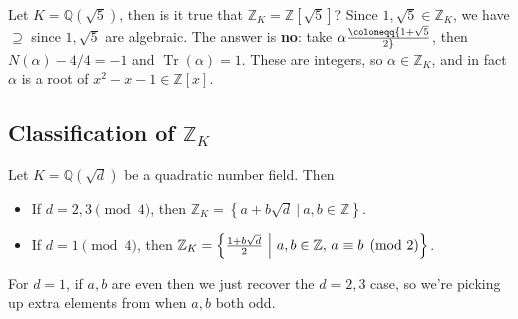 \begin{example}

Let \(K = {\mathbb{Q}}( \sqrt{5} )\), then is it true that
\({\mathbb{Z}}_K = {\mathbb{Z}}[\sqrt{5} ]\)? Since
\(1, \sqrt{5} \in {\mathbb{Z}}_K\), we have \(\supseteq\) since
\(1, \sqrt{5}\) are algebraic. The answer is \textbf{no}: take
\(\alpha\coloneqq{1 + \sqrt{5} \over 2}\), then \(N( \alpha) -4/4 = -1\)
and \(\operatorname{Tr}( \alpha) = 1\). These are integers, so
\(\alpha\in {\mathbb{Z}}_K\), and in fact \(\alpha\) is a root of
\(x^2 - x - 1 \in {\mathbb{Z}}[x]\).

\end{example}

\hypertarget{classification-of-mathbbz_k}{%
\subsection{\texorpdfstring{Classification of
\({\mathbb{Z}}_K\)}{Classification of \{\textbackslash mathbb\{Z\}\}\_K}}\label{classification-of-mathbbz_k}}

\begin{theorem}

Let \(K = {\mathbb{Q}}( \sqrt{d} )\) be a quadratic number field. Then

\begin{itemize}
\item
  If \(d = 2,3 \pmod 4\), then
  \({\mathbb{Z}}_K = \left\{{ a + b \sqrt{d} {~\mathrel{\Big|}~}a, b\in {\mathbb{Z}}}\right\}\).
\item
  If \(d=1 \pmod 4\), then
  \({\mathbb{Z}}_K = \left\{{ {1 + b \sqrt{d} \over 2} {~\mathrel{\Big|}~}a,b\in {\mathbb{Z}},\, a\equiv b \pmod 2}\right\}\).
\end{itemize}

\end{theorem}

\begin{remark}

For \(d=1\), if \(a, b\) are even then we just recover the \(d=2,3\)
case, so we're picking up extra elements from when \(a,b\) both odd.

\end{remark}


